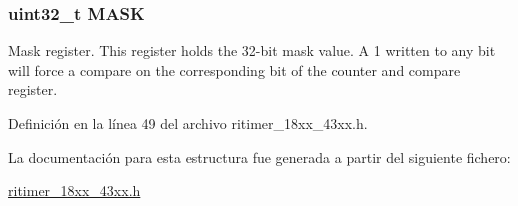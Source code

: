 \subsubsection[{\texorpdfstring{M\+A\+SK}{MASK}}]{ uint32\+\_\+t M\+A\+SK}\hypertarget{struct_l_p_c___r_i_t_i_m_e_r___t_a5c955643593b4aedbe9f84f054d26522}{}\label{struct_l_p_c___r_i_t_i_m_e_r___t_a5c955643593b4aedbe9f84f054d26522}
Mask register. This register holds the 32-\/bit mask value. A 1 written to any bit will force a compare on the corresponding bit of the counter and compare register. 

Definición en la línea 49 del archivo ritimer\+\_\+18xx\+\_\+43xx.\+h.



La documentación para esta estructura fue generada a partir del siguiente fichero\+:\begin{DoxyCompactItemize}
\item 
\hyperlink{ritimer__18xx__43xx_8h}{ritimer\+\_\+18xx\+\_\+43xx.\+h}\end{DoxyCompactItemize}

